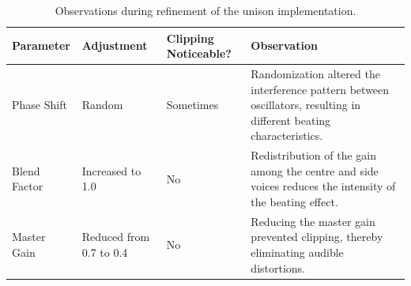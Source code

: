 \begin{table}[h]
\centering
\caption{Observations during refinement of the unison implementation.}
\begin{tabular}{|l|p{2.5cm}|>{\centering\arraybackslash}p{4cm}|p{5.5cm}|}
\hline
\textbf{Parameter} &
\textbf{Adjustment} &
\textbf{Clipping Noticeable?} &
\textbf{Observation} \\
\hline

Phase Shift &
Random &
Sometimes &
Randomization altered the interference pattern between oscillators, resulting in different beating characteristics. \\
\hline

Blend Factor &
Increased to 1.0 &
No &
Redistribution of the gain among the centre and side voices reduces the intensity of the beating effect. \\
\hline

Master Gain &
Reduced from 0.7 to 0.4 &
No &
Reducing the master gain prevented clipping, thereby eliminating audible distortions. \\
\hline

\end{tabular}
\label{tab:unison_observations}
\end{table}